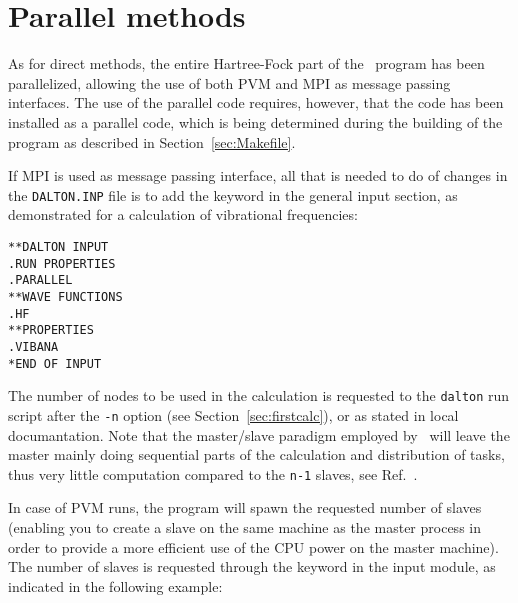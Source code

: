 \section{Parallel methods}\label{sec:parallel}

\begin{center}
\end{center}

As for direct methods, the entire Hartree-Fock part of the \siraba\
program has been parallelized, allowing the use of both PVM and
MPI as
message passing interfaces. The use of the parallel code requires,
however, that the code has been installed as a parallel
code, which is
being determined during the building of the program as described in
Section~\ref{sec:Makefile}.

If MPI is used as message passing interface, all that is needed to do
of changes in the \verb|DALTON.INP| file is to add the keyword
 in the general input section, as demonstrated for a
calculation of vibrational frequencies\index{vibrational frequency}:

\begin{verbatim}
**DALTON INPUT
.RUN PROPERTIES
.PARALLEL
**WAVE FUNCTIONS
.HF
**PROPERTIES
.VIBANA
*END OF INPUT
\end{verbatim}

The number of nodes to be used in the calculation is
requested to the 
\verb|dalton| run script after the \verb|-n| option (see
Section~\ref{sec:firstcalc}), or as stated in local
documantation. Note that the master/slave
paradigm employed by 
\siraba\ will leave the master mainly doing sequential parts of the
calculation and distribution of tasks, thus very little computation
compared to the \verb|n-1| slaves, see
Ref.~\cite{pndjhapdkrthhkcpl253}.

In case of PVM runs, the program will spawn the requested number of
slaves (enabling you to create a slave on the same machine as the
master process in order to provide a more efficient use of the CPU
power on the master machine). The number of slaves is requested
through the keyword  in the  input module, as
indicated in the following example: 

